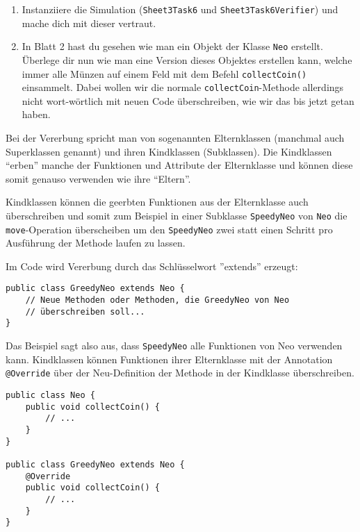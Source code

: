 \begin{enumerate}
	\item
	Instanziiere die Simulation (\lstinline{Sheet3Task6} und  \lstinline{Sheet3Task6Verifier}) und mache dich mit dieser vertraut.

	\item In Blatt 2 hast du gesehen wie man ein Objekt der Klasse \lstinline{Neo} erstellt.
	Überlege dir nun wie man eine Version dieses Objektes erstellen kann, welche immer alle Münzen auf einem Feld mit dem Befehl \lstinline{collectCoin()} einsammelt.
	Dabei wollen wir die normale \lstinline{collectCoin}-Methode allerdings nicht wort-wörtlich mit neuen Code überschreiben, wie wir das bis jetzt getan haben.
\end{enumerate}

\begin{Infobox}[Vererbung]


Bei der Vererbung spricht man von sogenannten Elternklassen (manchmal auch Superklassen genannt) und ihren Kindklassen (Subklassen).
Die Kindklassen \enquote{erben} manche der Funktionen und Attribute der Elternklasse und können diese somit genauso verwenden wie ihre \enquote{Eltern}.\newline

Kindklassen können die geerbten Funktionen aus der Elternklasse auch überschreiben und somit zum Beispiel in einer Subklasse \lstinline{SpeedyNeo} von \lstinline{Neo} die \lstinline{move}-Operation überscheiben um den \lstinline{SpeedyNeo} zwei statt einen Schritt pro Ausführung der Methode laufen zu lassen.

Im Code wird Vererbung durch das Schlüsselwort ''extends'' erzeugt:

\begin{lstlisting}[xleftmargin=0.5cm]
public class GreedyNeo extends Neo {
	// Neue Methoden oder Methoden, die GreedyNeo von Neo
	// überschreiben soll...
}
\end{lstlisting}

Das Beispiel sagt also aus, dass \lstinline{SpeedyNeo} alle Funktionen von Neo verwenden kann.\newline
Kindklassen können Funktionen ihrer Elternklasse mit der Annotation \lstinline{@Override} über der Neu-Definition der Methode in der Kindklasse überschreiben.

\begin{lstlisting}[xleftmargin=0.5cm]
public class Neo {
	public void collectCoin() {
		// ...
	}
}

public class GreedyNeo extends Neo {
	@Override
	public void collectCoin() {
		// ...
	}
}
\end{lstlisting}
\end{Infobox}



